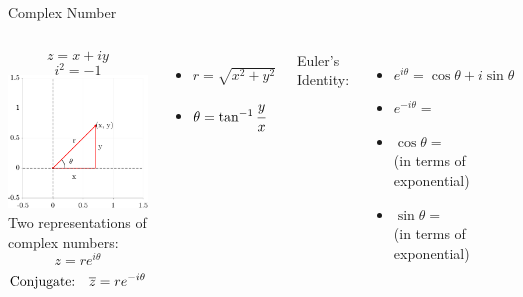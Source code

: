 \documentclass[aspectratio=169,xcolor=dvipsnames,svgnames,x11names,fleqn]{beamer}
\begin{document}

\begin{frame}{Complex Number}
 \begin{columns}
$$z = x +  i y$$
$$ i^2  = -1$$
\includegraphics[width=0.99\linewidth, trim=2cm 2cm 1cm 1cm,clip]{figures/complex_num.pdf}
Two representations of complex numbers:
$$
z = re^{i\theta}
$$
$$
\text{Conjugate:~~~} {\overline z} = re^{-i\theta}
$$
    \begin{itemize}
        \item $ r = \sqrt{x^2 + y^2}$
        \item $\theta = \tan ^{-1} \cfrac{y}{x}$
    \end{itemize}
    Euler's Identity:
    \begin{itemize}\setlength\itemsep{1.0em}
        \item $e^{i\theta} = \cos \theta + i \sin \theta$
        \item $e^{- i\theta} = $
        \item $\cos \theta  = \quad\quad\quad\quad$\\ (in terms of exponential)
        \item $\sin \theta  = \quad\quad\quad\quad$\\ (in terms of exponential)
    \end{itemize}
\end{columns}
\end{frame}
\end{document}
